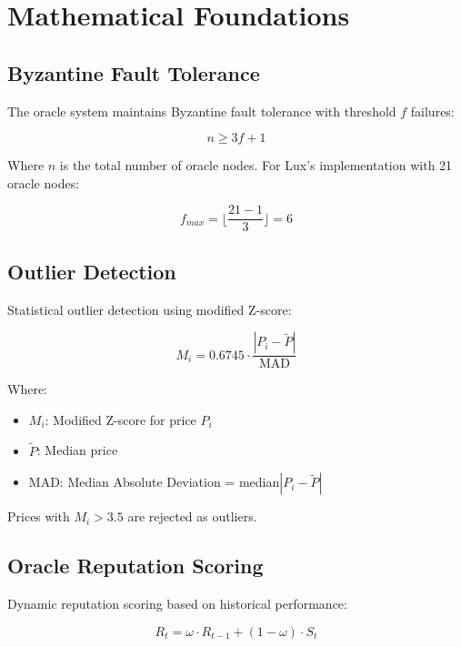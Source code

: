 \section{Mathematical Foundations}


\subsection{Byzantine Fault Tolerance}

The oracle system maintains Byzantine fault tolerance with threshold $f$ failures:

\begin{equation}
n \geq 3f + 1
\end{equation}

Where $n$ is the total number of oracle nodes. For Lux's implementation with 21 oracle nodes:

\begin{equation}
f_{max} = \lfloor \frac{21 - 1}{3} \rfloor = 6
\end{equation}

\subsection{Outlier Detection}

Statistical outlier detection using modified Z-score:

\begin{equation}
M_i = 0.6745 \cdot \frac{|P_i - \tilde{P}|}{\text{MAD}}
\end{equation}

Where:
\begin{itemize}
    \item $M_i$: Modified Z-score for price $P_i$
    \item $\tilde{P}$: Median price
    \item MAD: Median Absolute Deviation = median$|P_i - \tilde{P}|$
\end{itemize}

Prices with $M_i > 3.5$ are rejected as outliers.

\subsection{Oracle Reputation Scoring}

Dynamic reputation scoring based on historical performance:

\begin{equation}
R_t = \omega \cdot R_{t-1} + (1 - \omega) \cdot S_t
\end{equation}

